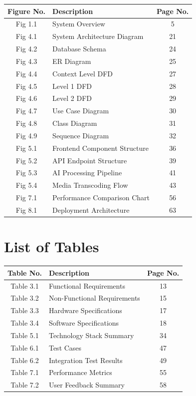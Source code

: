 \documentclass[12pt,a4paper]{report}
\begin{document}
\begin{table}[H]
\centering
\begin{tabular}{|c|l|c|}
\hline
\textbf{Figure No.} & \textbf{Description} & \textbf{Page No.} \\
\hline
Fig 1.1 & System Overview & 5 \\
\hline
Fig 4.1 & System Architecture Diagram & 21 \\
\hline
Fig 4.2 & Database Schema & 24 \\
\hline
Fig 4.3 & ER Diagram & 25 \\
\hline
Fig 4.4 & Context Level DFD & 27 \\
\hline
Fig 4.5 & Level 1 DFD & 28 \\
\hline
Fig 4.6 & Level 2 DFD & 29 \\
\hline
Fig 4.7 & Use Case Diagram & 30 \\
\hline
Fig 4.8 & Class Diagram & 31 \\
\hline
Fig 4.9 & Sequence Diagram & 32 \\
\hline
Fig 5.1 & Frontend Component Structure & 36 \\
\hline
Fig 5.2 & API Endpoint Structure & 39 \\
\hline
Fig 5.3 & AI Processing Pipeline & 41 \\
\hline
Fig 5.4 & Media Transcoding Flow & 43 \\
\hline
Fig 7.1 & Performance Comparison Chart & 56 \\
\hline
Fig 8.1 & Deployment Architecture & 63 \\
\hline
\end{tabular}
\end{table}

\newpage
\chapter*{List of Tables}

\begin{table}[H]
\centering
\begin{tabular}{|c|l|c|}
\hline
\textbf{Table No.} & \textbf{Description} & \textbf{Page No.} \\
\hline
Table 3.1 & Functional Requirements & 13 \\
\hline
Table 3.2 & Non-Functional Requirements & 15 \\
\hline
Table 3.3 & Hardware Specifications & 17 \\
\hline
Table 3.4 & Software Specifications & 18 \\
\hline
Table 5.1 & Technology Stack Summary & 34 \\
\hline
Table 6.1 & Test Cases & 47 \\
\hline
Table 6.2 & Integration Test Results & 49 \\
\hline
Table 7.1 & Performance Metrics & 55 \\
\hline
Table 7.2 & User Feedback Summary & 58 \\
\hline
\end{tabular}
\end{table}
\end{document}
